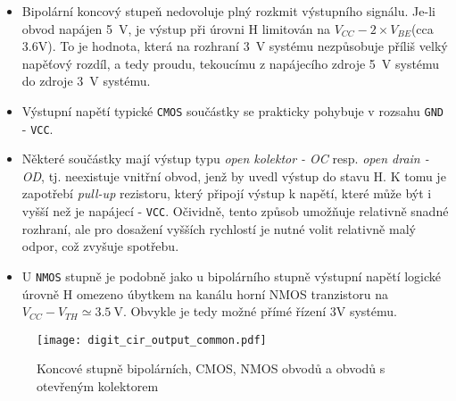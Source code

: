     \begin{itemize}
      \item Bipolární koncový stupeň nedovoluje plný rozkmit výstupního signálu. Je-li obvod
            napájen \SI{5}{\volt}, je výstup při úrovni H limitován na $V_{CC}-2\times V_{BE}$(cca
            3.6V). To je hodnota, která na rozhraní \SI{3}{\volt} systému nezpůsobuje příliš velký
            napěťový rozdíl, a tedy proudu, tekoucímu z napájecího zdroje \SI{5}{\volt} systému do
            zdroje \SI{3}{\volt} systému.
      \item Výstupní napětí typické \texttt{CMOS} součástky se prakticky pohybuje v rozsahu
            \texttt{GND} - \texttt{VCC}.
      \item Některé součástky mají výstup typu \emph{open kolektor - OC} resp. \emph{open drain -
            OD}, tj. neexistuje vnitřní obvod, jenž by uvedl výstup do stavu H. K tomu je zapotřebí
            \emph{pull-up} rezistoru, který připojí výstup k napětí, které může být i vyšší než je
            napájecí - \texttt{VCC}. Očividně, tento způsob umožňuje relativně snadné rozhraní, ale
            pro dosažení vyšších rychlostí je nutné volit relativně malý odpor, což zvyšuje
            spotřebu.
      \item U \texttt{NMOS} stupně je podobně jako u bipolárního stupně výstupní napětí logické
            úrovně H omezeno úbytkem na kanálu horní NMOS tranzistoru na $V_{CC} - V_{TH}\simeq
            \SI{3.5}{\volt}$. Obvykle je tedy možné přímé řízení 3V systému.
    \end{itemize}

    \begin{figure}[ht!]
         \centering
         \texttt{[image: digit\_cir\_output\_common.pdf]}
         \caption[Koncové stupně digitálních obvodů]
                 {Koncové stupně bipolárních, CMOS, NMOS obvodů a obvodů s otevřeným kolektorem 
                  \cite[p.~2]{AN240}}
         \label{ces:fig_digit_out_common}
    \end{figure}   
    

